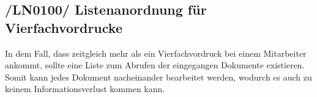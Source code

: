 \subsection{/LN0100/ Listenanordnung für Vierfachvordrucke}
In dem Fall, dass zeitgleich mehr als ein Vierfachvordruck bei einem Mitarbeiter ankommt, sollte eine Liste zum Abrufen der eingegangen Dokumente existieren. Somit kann jedes Dokument nacheinander bearbeitet werden, wodurch es auch zu keinem Informationsverlust kommen kann.